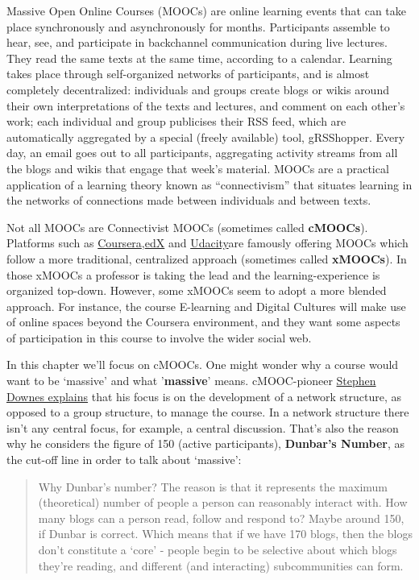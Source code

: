 Massive Open Online Courses (MOOCs) are online learning events that can
take place synchronously and asynchronously for months. Participants
assemble to hear, see, and participate in backchannel communication
during live lectures. They read the same texts at the same time,
according to a calendar. Learning takes place through self-organized
networks of participants, and is almost completely decentralized:
individuals and groups create blogs or wikis around their own
interpretations of the texts and lectures, and comment on each other's
work; each individual and group publicises their RSS feed, which are
automatically aggregated by a special (freely available) tool,
gRSShopper. Every day, an email goes out to all participants,
aggregating activity streams from all the blogs and wikis that engage
that week's material. MOOCs are a practical application of a learning
theory known as ``connectivism'' that situates learning in the networks
of connections made between individuals and between texts.

Not all MOOCs are Connectivist MOOCs (sometimes called \textbf{cMOOCs}).
Platforms such as
\href{https://www.coursera.org/}{Coursera},\href{https://www.edx.org/}{edX}
and \href{http://www.udacity.com/}{Udacity}are famously offering MOOCs
which follow a more traditional, centralized approach (sometimes called
\textbf{xMOOCs}). In those xMOOCs a professor is taking the lead and the
learning-experience is organized top-down. However, some xMOOCs seem to
adopt a more blended approach. For instance, the course E-learning and
Digital Cultures will make use of online spaces beyond the Coursera
environment, and they want some aspects of participation in this course
to involve the wider social web.

In this chapter we'll focus on cMOOCs. One might wonder why a course
would want to be `massive' and what '\textbf{massive}' means.
cMOOC-pioneer
\href{http://halfanhour.blogspot.ca/2013/01/what-makes-mooc-massive.html}{Stephen
Downes explains} that his focus is on the development of a network
structure, as opposed to a group structure, to manage the course. In a
network structure there isn't any central focus, for example, a central
discussion. That's also the reason why he considers the figure of 150
(active participants), \textbf{Dunbar's Number}, as the cut-off line in
order to talk about `massive':

\begin{quote}
Why Dunbar's number? The reason is that it represents the maximum
(theoretical) number of people a person can reasonably interact with.
How many blogs can a person read, follow and respond to? Maybe around
150, if Dunbar is correct. Which means that if we have 170 blogs, then
the blogs don't constitute a `core' - people begin to be selective about
which blogs they're reading, and different (and interacting)
subcommunities can form.
\end{quote}
